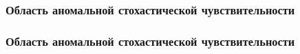 \documentclass[slidestop,compress,mathserif]{beamer}
\begin{document}
\begin{frame}
\frametitle{Область аномальной стохастической чувствительности}
\begin{figure}[h!]
\vspace{-1em}
\vspace{-2em}
\end{figure}
\end{frame}
\begin{frame}
\frametitle{Область аномальной стохастической чувствительности}
\begin{figure}[h!]
\vspace{-1em}
\vspace{-2em}
\end{figure}
\end{frame}
\begin{frame}
\vspace{8em}
\end{frame}
\end{document}
